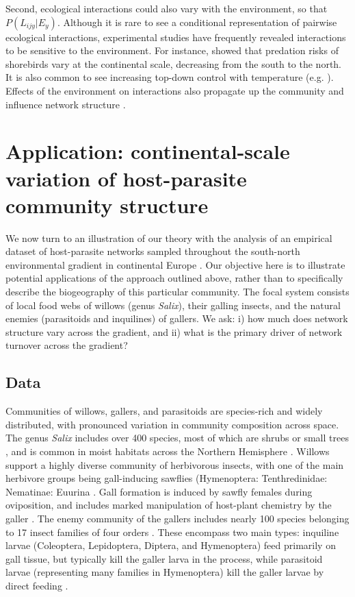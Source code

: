 \documentclass[12pt]{article}
\begin{document}
Second, ecological interactions could also vary with the environment, so that
$P(L_{ijy}\lvert E_y)$. Although it is rare to see a conditional representation of
pairwise ecological interactions, experimental studies have frequently
revealed interactions to be sensitive to the environment. For instance,
\citet{Mckinnon2010} showed that predation risks of shorebirds vary at the
continental scale, decreasing from the south to the north. It is also common
to see increasing top-down control with temperature (e.g. \citealt{Shurin2012,
Gray2016}). Effects of the environment on interactions \citep{Gibert2014} also
propagate up the community and influence network structure
\citep{Tylianakis2007, Woodward2010, Petchey2010a}.


\section*{Application: continental-scale variation of host-parasite community structure}

We now turn to an illustration of our theory with the analysis of an empirical
dataset of host-parasite networks sampled throughout the south-north
environmental gradient in continental Europe \citep{Kopelke2017}. Our
objective here is to illustrate potential applications of the approach
outlined above, rather than to specifically describe the biogeography
of this particular community. The focal system consists of local food webs of
willows (genus \textit{Salix}), their galling insects, and the natural enemies
(parasitoids and inquilines) of gallers. We ask:
i) how much does network structure vary across the gradient, and ii) what is
the primary driver of network turnover across the gradient?

\subsection*{Data}

Communities of willows, gallers, and parasitoids are species-rich and widely
distributed, with pronounced variation in community composition across space.
The genus \textit{Salix} includes over 400 species, most of which are shrubs
or small trees \citep{Argus1997}, and is common in moist habitats across the
Northern Hemisphere \citep{Skvortsov1999}. Willows support a highly diverse
community of herbivorous insects, with one of the main herbivore groups being
gall-inducing sawflies (Hymenoptera: Tenthredinidae: Nematinae: Euurina
\citep{Kopelke1999}. Gall formation is induced by sawfly females during
oviposition, and includes marked manipulation of host-plant chemistry by the
galler \citep{Nyman2000}. The enemy community of the gallers includes nearly
100 species belonging to 17 insect families of four orders
\citep{Kopelke2003}. These encompass two main types: inquiline larvae
(Coleoptera, Lepidoptera, Diptera, and Hymenoptera) feed primarily on gall
tissue, but typically kill the galler larva in the process, while parasitoid
larvae (representing many families in Hymenoptera) kill the galler larvae by
direct feeding \citep{Kopelke2003}.
\end{document}
